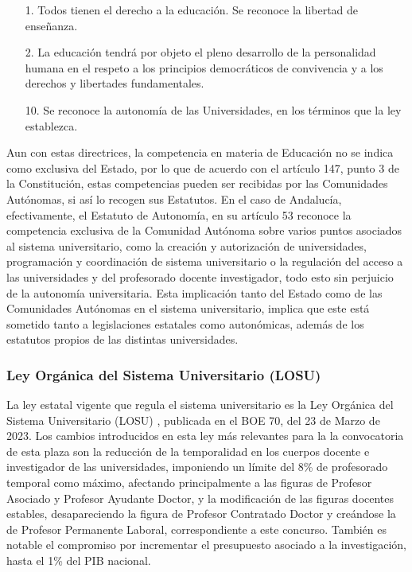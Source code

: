 \documentclass[a4paper,12pt,twoside]{article}
\begin{document}
\begin{enumerate}
\item[1.] Todos tienen el derecho a la educación. Se reconoce la libertad de enseñanza.
\item[2.] La educación tendrá por objeto el pleno desarrollo de la personalidad humana en el respeto a los principios democráticos de convivencia y a los derechos y libertades fundamentales.
\item[10.] Se reconoce la autonomía de las Universidades, en los términos que la ley establezca.
\end{enumerate}

Aun con estas directrices, la competencia en materia de Educación no se indica como exclusiva del Estado, por lo que de acuerdo con el artículo 147, punto 3 de la Constitución, estas competencias pueden ser recibidas por las Comunidades Autónomas, si así lo recogen sus Estatutos. En el caso de Andalucía, efectivamente, el Estatuto de Autonomía, en su artículo 53 reconoce la competencia exclusiva de la Comunidad Autónoma sobre varios puntos asociados al sistema universitario, como la creación y autorización de universidades, programación y coordinación de sistema universitario o la regulación del acceso a las universidades y del profesorado docente investigador, todo esto sin perjuicio de la autonomía universitaria. Esta implicación tanto del Estado como de las Comunidades Autónomas en el sistema universitario, implica que este está sometido tanto a legislaciones estatales como autonómicas, además de los estatutos propios de las distintas universidades.

\subsubsection{Ley Orgánica del Sistema Universitario (LOSU)}

La ley estatal vigente que regula el sistema universitario es la Ley Orgánica del Sistema Universitario (LOSU) \cite{losu}, publicada en el BOE 70, del 23 de Marzo de 2023. Los cambios introducidos en esta ley más relevantes para la la convocatoria de esta plaza son la reducción de la temporalidad en los cuerpos docente e investigador de las universidades, imponiendo un límite del 8\% de profesorado temporal como máximo, afectando principalmente a las figuras de Profesor Asociado y Profesor Ayudante Doctor, y la modificación de las figuras docentes estables, desapareciendo la figura de Profesor Contratado Doctor y creándose la de Profesor Permanente Laboral, correspondiente a este concurso. También es notable el compromiso por incrementar el presupuesto asociado a la investigación, hasta el 1\% del PIB nacional.
\end{document}
